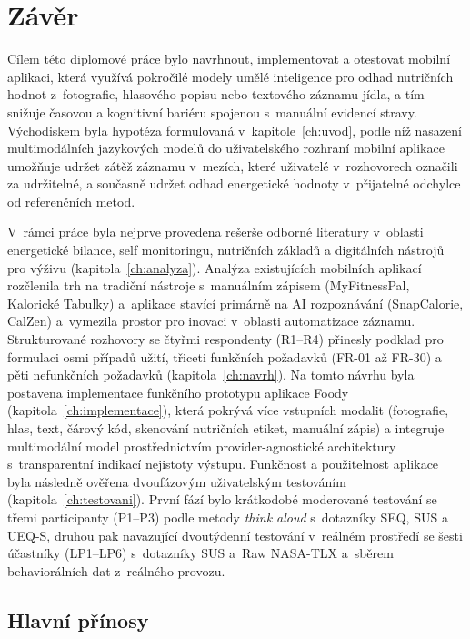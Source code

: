 \chapter{Závěr}
\label{ch:zaver}

Cílem této diplomové práce bylo navrhnout, implementovat a otestovat mobilní aplikaci, která využívá pokročilé modely umělé inteligence pro odhad nutričních hodnot z~fotografie, hlasového popisu nebo textového záznamu jídla, a tím snižuje časovou a kognitivní bariéru spojenou s~manuální evidencí stravy.
Východiskem byla hypotéza formulovaná v~kapitole~\ref{ch:uvod}, podle níž nasazení multimodálních jazykových modelů do uživatelského rozhraní mobilní aplikace umožňuje udržet zátěž záznamu v~mezích, které uživatelé v~rozhovorech označili za udržitelné, a současně udržet odhad energetické hodnoty v~přijatelné odchylce od referenčních metod.

V~rámci práce byla nejprve provedena rešerše odborné literatury v~oblasti energetické bilance, self monitoringu, nutričních základů a digitálních nástrojů pro výživu (kapitola~\ref{ch:analyza}).
Analýza existujících mobilních aplikací rozčlenila trh na tradiční nástroje s~manuálním zápisem (MyFitnessPal, Kalorické Tabulky) a~aplikace stavící primárně na AI rozpoznávání (SnapCalorie, CalZen) a~vymezila prostor pro inovaci v~oblasti automatizace záznamu.
Strukturované rozhovory se čtyřmi respondenty (R1--R4) přinesly podklad pro formulaci osmi případů užití, třiceti funkčních požadavků (FR-01 až FR-30) a pěti nefunkčních požadavků (kapitola~\ref{ch:navrh}).
Na tomto návrhu byla postavena implementace funkčního prototypu aplikace Foody (kapitola~\ref{ch:implementace}), která pokrývá více vstupních modalit (fotografie, hlas, text, čárový kód, skenování nutričních etiket, manuální zápis) a integruje multimodální model prostřednictvím provider-agnostické architektury s~transparentní indikací nejistoty výstupu.
Funkčnost a použitelnost aplikace byla následně ověřena dvoufázovým uživatelským testováním (kapitola~\ref{ch:testovani}).
První fází bylo krátkodobé moderované testování se třemi participanty (P1--P3) podle metody \emph{think aloud} s~dotazníky SEQ, SUS a UEQ-S, druhou pak navazující dvoutýdenní testování v~reálném prostředí se šesti účastníky (LP1--LP6) s~dotazníky SUS a~Raw NASA-TLX a~sběrem behaviorálních dat z~reálného provozu.

\section*{Hlavní přínosy}

